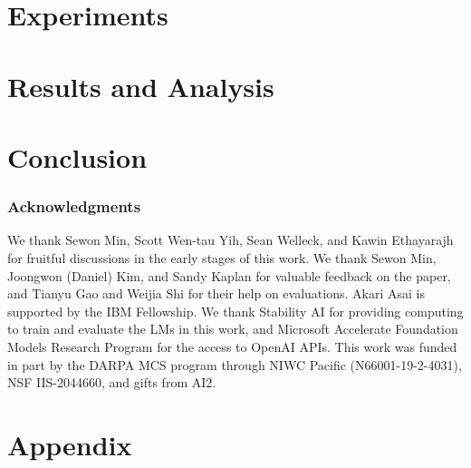 \documentclass{article} %
\begin{document}
\section{Experiments}



\section{Results and Analysis}



\section{Conclusion}





\subsubsection*{Acknowledgments}
We thank Sewon Min, Scott Wen-tau Yih, Sean Welleck, and Kawin Ethayarajh for fruitful discussions in the early stages of this work. 
We thank Sewon Min, Joongwon (Daniel) Kim, and Sandy Kaplan for valuable feedback on the paper, and Tianyu Gao and Weijia Shi for their help on evaluations. 
Akari Asai is supported by the IBM Fellowship. 
We thank Stability AI for providing computing to train and evaluate the LMs in this work, and Microsoft Accelerate Foundation Models Research Program for the access to OpenAI APIs. 
This work was funded in part by the DARPA MCS program through NIWC Pacific (N66001-19-2-4031), NSF IIS-2044660, and gifts from AI2.




\clearpage
\appendix
\section*{Appendix}

\end{document}
